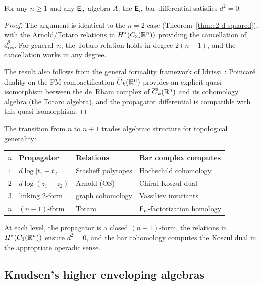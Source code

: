 \begin{theorem}[\texorpdfstring{$d^2 = 0$}{d squared = 0} for the \texorpdfstring{$\En$}{En} bar complex;
\ClaimStatusProvedElsewhere]
\label{thm:en-d-squared}
For any $n \geq 1$ and any $\En$-algebra $A$, the $\En$ bar
differential satisfies $d^2 = 0$.
\end{theorem}

\begin{proof}
The argument is identical to the $n = 2$ case
(Theorem~\ref{thm:e2-d-squared}), with the Arnold/Totaro
relations in $H^*(C_3(\mathbb{R}^n))$ providing the cancellation of
$d_{\mathrm{res}}^2$.  For general~$n$, the Totaro relation holds
in degree $2(n-1)$, and the cancellation works in any degree.

The result also follows from the general formality framework of
Idrissi~\cite{Idrissi22}: Poincar\'e duality on the FM
compactification $\overline{C}_k(\mathbb{R}^n)$ provides an explicit
quasi-isomorphism between the de~Rham complex of
$\overline{C}_k(\mathbb{R}^n)$ and its cohomology algebra (the Totaro
algebra), and the propagator differential is compatible with this
quasi-isomorphism.
\end{proof}

\begin{remark}
\label{rem:dimensional-ladder}
The transition from $n$ to $n+1$ trades algebraic structure for
topological generality:
\begin{center}
\begin{tabular}{clll}
$n$ & Propagator & Relations & Bar complex computes \\
\hline
$1$ & $d\log|t_1 - t_2|$ & Stasheff polytopes & Hochschild cohomology \\
$2$ & $d\log(z_1 - z_2)$ & Arnold (OS) & Chiral Koszul dual \\
$3$ & linking $2$-form & graph cohomology & Vassiliev invariants \\
$n$ & $(n{-}1)$-form & Totaro & $\En$-factorization homology
\end{tabular}
\end{center}
At each level, the propagator is a closed $(n-1)$-form, the
relations in $H^*(C_3(\mathbb{R}^n))$ ensure $d^2 = 0$, and the bar
cohomology computes the Koszul dual in the appropriate operadic
sense.
\end{remark}


\subsection{Knudsen's higher enveloping algebras}

